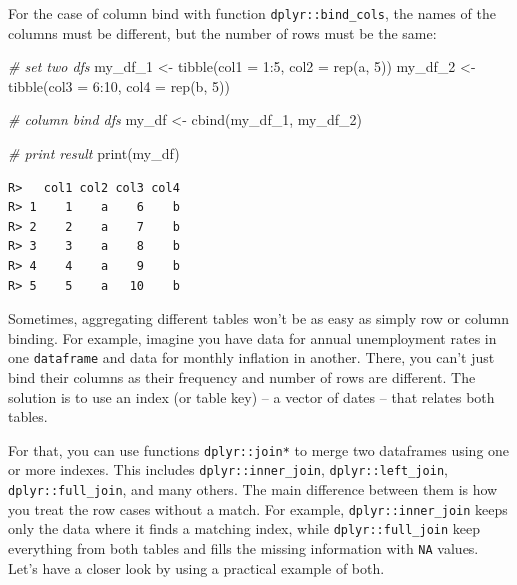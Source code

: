 \documentclass[
  12pt,
]{book}
\newenvironment{Shaded}{\begin{snugshade}}{\end{snugshade}}
\newcommand{\AttributeTok}[1]{\textcolor[rgb]{0.61,0.61,0.61}{#1}}
\newcommand{\CommentTok}[1]{\textcolor[rgb]{0.37,0.37,0.37}{\textit{#1}}}
\newcommand{\DecValTok}[1]{\textcolor[rgb]{0.06,0.06,0.06}{#1}}
\newcommand{\FunctionTok}[1]{\textcolor[rgb]{0,0,0}{#1}}
\newcommand{\NormalTok}[1]{#1}
\newcommand{\OtherTok}[1]{\textcolor[rgb]{0.37,0.37,0.37}{#1}}
\newcommand{\SpecialCharTok}[1]{\textcolor[rgb]{0,0,0}{#1}}
\newcommand{\StringTok}[1]{\textcolor[rgb]{0.5,0.5,0.5}{#1}}
\begin{document}
For the case of column bind with function \texttt{dplyr::bind\_cols}, the names of the columns must be different, but the number of rows must be the same: 

\begin{Shaded}
\begin{Highlighting}[]
\CommentTok{\# set two dfs}
\NormalTok{my\_df\_1 }\OtherTok{\textless{}{-}} \FunctionTok{tibble}\NormalTok{(}\AttributeTok{col1 =} \DecValTok{1}\SpecialCharTok{:}\DecValTok{5}\NormalTok{, }
                  \AttributeTok{col2 =} \FunctionTok{rep}\NormalTok{(}\StringTok{\textquotesingle{}a\textquotesingle{}}\NormalTok{, }\DecValTok{5}\NormalTok{))}
\NormalTok{my\_df\_2 }\OtherTok{\textless{}{-}} \FunctionTok{tibble}\NormalTok{(}\AttributeTok{col3 =} \DecValTok{6}\SpecialCharTok{:}\DecValTok{10}\NormalTok{, }
                  \AttributeTok{col4 =} \FunctionTok{rep}\NormalTok{(}\StringTok{\textquotesingle{}b\textquotesingle{}}\NormalTok{, }\DecValTok{5}\NormalTok{))}

\CommentTok{\# column bind dfs}
\NormalTok{my\_df }\OtherTok{\textless{}{-}} \FunctionTok{cbind}\NormalTok{(my\_df\_1, my\_df\_2)}

\CommentTok{\# print result}
\FunctionTok{print}\NormalTok{(my\_df)}
\end{Highlighting}
\end{Shaded}

\begin{verbatim}
R>   col1 col2 col3 col4
R> 1    1    a    6    b
R> 2    2    a    7    b
R> 3    3    a    8    b
R> 4    4    a    9    b
R> 5    5    a   10    b
\end{verbatim}

Sometimes, aggregating different tables won't be as easy as simply row or column binding. For example, imagine you have data for annual unemployment rates in one \texttt{dataframe} and data for monthly inflation in another. There, you can't just bind their columns as their frequency and number of rows are different. The solution is to use an index (or table key) -- a vector of dates -- that relates both tables.

For that, you can use functions \texttt{dplyr::join*} to merge two dataframes using one or more indexes. This includes \texttt{dplyr::inner\_join}, \texttt{dplyr::left\_join}, \texttt{dplyr::full\_join}, and many others. The main difference between them is how you treat the row cases without a match. For example, \texttt{dplyr::inner\_join} keeps only the data where it finds a matching index, while \texttt{dplyr::full\_join} keep everything from both tables and fills the missing information with \texttt{NA} values. Let's have a closer look by using a practical example of both.
\end{document}
